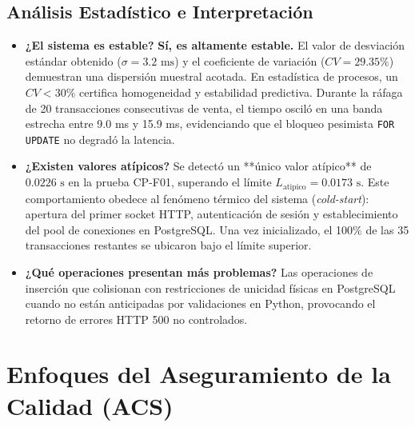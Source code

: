 \documentclass{article}
\begin{document}
\subsection{Análisis Estadístico e Interpretación}
\begin{itemize}[leftmargin=*]
\item \textbf{¿El sistema es estable?}
\textbf{Sí, es altamente estable.} El valor de desviación estándar obtenido ($\sigma = 3.2\text{ ms}$) y el coeficiente de variación ($CV = 29.35\%$) demuestran una dispersión muestral acotada. En estadística de procesos, un $CV < 30\%$ certifica homogeneidad y estabilidad predictiva. Durante la ráfaga de 20 transacciones consecutivas de venta, el tiempo osciló en una banda estrecha entre 9.0 ms y 15.9 ms, evidenciando que el bloqueo pesimista \texttt{FOR UPDATE} no degradó la latencia.

\item \textbf{¿Existen valores atípicos?}
Se detectó un **único valor atípico** de $0.0226\text{ s}$ en la prueba CP-F01, superando el límite $L_{\text{atipico}} = 0.0173\text{ s}$. Este comportamiento obedece al fenómeno térmico del sistema (\textit{cold-start}): apertura del primer socket HTTP, autenticación de sesión y establecimiento del pool de conexiones en PostgreSQL. Una vez inicializado, el 100\% de las 35 transacciones restantes se ubicaron bajo el límite superior.

\item \textbf{¿Qué operaciones presentan más problemas?}
Las operaciones de inserción que colisionan con restricciones de unicidad físicas en PostgreSQL cuando no están anticipadas por validaciones en Python, provocando el retorno de errores HTTP 500 no controlados.
\end{itemize}

\section{Enfoques del Aseguramiento de la Calidad (ACS)}
\end{document}

